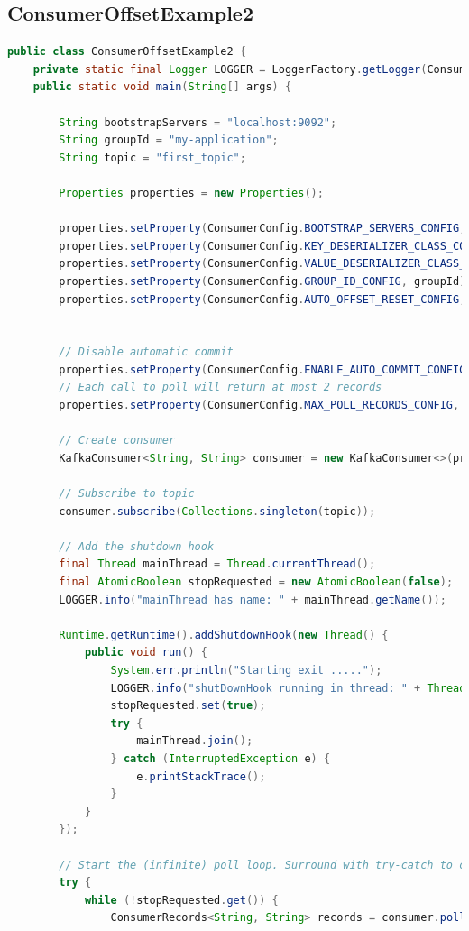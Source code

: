 \documentclass[a4paper,10pt,twoside]{report}
\begin{document}
\subsection{ConsumerOffsetExample2}

\begin{lstlisting}[language=Java]
public class ConsumerOffsetExample2 {
	private static final Logger LOGGER = LoggerFactory.getLogger(ConsumerDemo.class);
	public static void main(String[] args) {
		
		String bootstrapServers = "localhost:9092";
		String groupId = "my-application";
		String topic = "first_topic";
		
		Properties properties = new Properties();
		
		properties.setProperty(ConsumerConfig.BOOTSTRAP_SERVERS_CONFIG, bootstrapServers);
		properties.setProperty(ConsumerConfig.KEY_DESERIALIZER_CLASS_CONFIG, StringDeserializer.class.getName());
		properties.setProperty(ConsumerConfig.VALUE_DESERIALIZER_CLASS_CONFIG, StringDeserializer.class.getName());
		properties.setProperty(ConsumerConfig.GROUP_ID_CONFIG, groupId);
		properties.setProperty(ConsumerConfig.AUTO_OFFSET_RESET_CONFIG, "earliest");
		
		
		// Disable automatic commit
		properties.setProperty(ConsumerConfig.ENABLE_AUTO_COMMIT_CONFIG, "false");
		// Each call to poll will return at most 2 records
		properties.setProperty(ConsumerConfig.MAX_POLL_RECORDS_CONFIG, "2"); 
		
		// Create consumer
		KafkaConsumer<String, String> consumer = new KafkaConsumer<>(properties);
		
		// Subscribe to topic
		consumer.subscribe(Collections.singleton(topic));
		
		// Add the shutdown hook
		final Thread mainThread = Thread.currentThread();
		final AtomicBoolean stopRequested = new AtomicBoolean(false);
		LOGGER.info("mainThread has name: " + mainThread.getName());
		
		Runtime.getRuntime().addShutdownHook(new Thread() {
			public void run() {
				System.err.println("Starting exit .....");
				LOGGER.info("shutDownHook running in thread: " + Thread.currentThread().getName());
				stopRequested.set(true);
				try {
					mainThread.join();
				} catch (InterruptedException e) {
					e.printStackTrace();
				}
			}
		});
		
		// Start the (infinite) poll loop. Surround with try-catch to catch the WakeupException
		try {
			while (!stopRequested.get()) {
				ConsumerRecords<String, String> records = consumer.poll(Duration.ofMillis(100));
				

\end{lstlisting}
\end{document}
